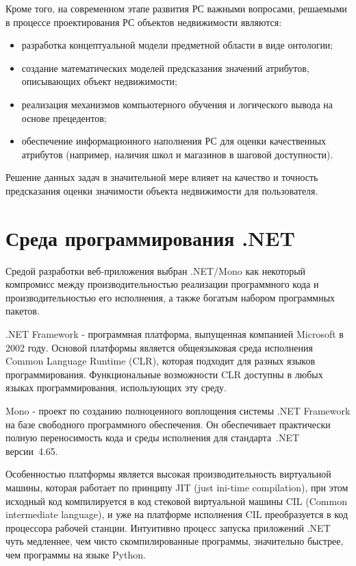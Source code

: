 \documentclass[a4paper,14pt,openany,final]{extreport} %
\begin{document}

Кроме того, на современном этапе развития РС важными вопросами, решаемыми в процессе проектирования РС объектов недвижимости являются:
\begin{itemize}
\item разработка концептуальной модели предметной области в виде онтологии;
\item создание математических моделей предсказания значений атрибутов, описывающих объект недвижимости;
\item реализация механизмов компьютерного обучения и логического вывода на основе прецедентов;
\item обеспечение информационного наполнения РС для оценки качественных атрибутов (например, наличия школ и магазинов в шаговой доступности).
\end{itemize}
Решение данных задач в значительной мере влияет на качество и точность предсказания оценки значимости объекта недвижимости для пользователя.


\section{Среда программирования .NET}
Средой разработки веб-приложения выбран .NET/Mono как некоторый компромисс между производительностью реализации программного кода и производительностью его исполнения, а также богатым набором программных пакетов.

.NET Framework - программная платформа, выпущенная компанией Microsoft в 2002 году. Основой платформы является общеязыковая среда исполнения Common Language Runtime (CLR), которая подходит для разных языков программирования. Функциональные возможности CLR доступны в любых языках программирования, использующих эту среду.

Mono - проект по созданию полноценного воплощения системы .NET Framework на базе свободного программного обеспечения. Он обеспечивает практически полную переносимость кода и среды исполнения для стандарта~.NET версии~4.65.

Особенностью платформы является высокая производительность виртуальной машины, которая работает по принципу JIT (just ini-time compilation), при этом исходный код компилируется в код стековой виртуальной машины CIL (Common intermediate language), и уже на платформе исполнения CIL преобразуется в код процессора рабочей станции. Интуитивно процесс запуска приложений .NET чуть медленнее, чем чисто скомпилированные программы, значительно быстрее, чем программы на языке Python.
\end{document}
